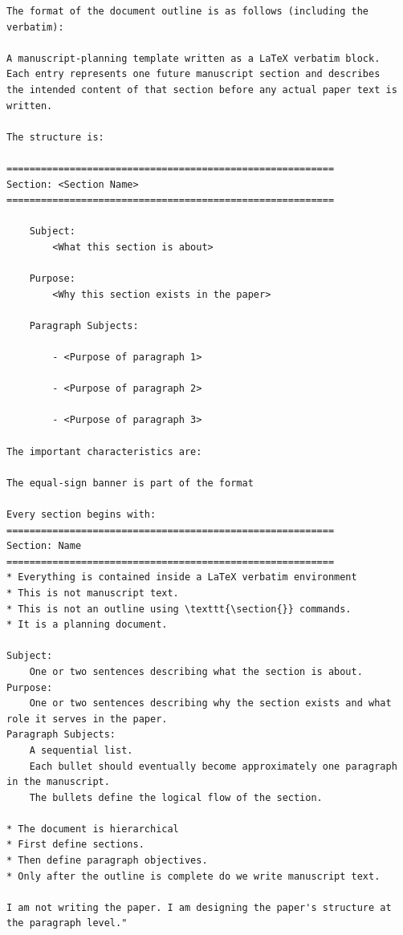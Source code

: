 \begin{verbatim}
The format of the document outline is as follows (including the verbatim):

A manuscript-planning template written as a LaTeX verbatim block. 
Each entry represents one future manuscript section and describes 
the intended content of that section before any actual paper text is written.

The structure is:

=========================================================
Section: <Section Name>
=========================================================

    Subject:
        <What this section is about>

    Purpose:
        <Why this section exists in the paper>

    Paragraph Subjects:

        - <Purpose of paragraph 1>

        - <Purpose of paragraph 2>

        - <Purpose of paragraph 3>

The important characteristics are:

The equal-sign banner is part of the format

Every section begins with:
=========================================================
Section: Name
=========================================================
* Everything is contained inside a LaTeX verbatim environment
* This is not manuscript text.
* This is not an outline using \texttt{\section{}} commands.
* It is a planning document.

Subject:
	One or two sentences describing what the section is about.
Purpose:
	One or two sentences describing why the section exists and what role it serves in the paper.
Paragraph Subjects:
	A sequential list.
	Each bullet should eventually become approximately one paragraph in the manuscript.
	The bullets define the logical flow of the section.

* The document is hierarchical
* First define sections.
* Then define paragraph objectives.
* Only after the outline is complete do we write manuscript text.

I am not writing the paper. I am designing the paper's structure at the paragraph level."
\end{verbatim}